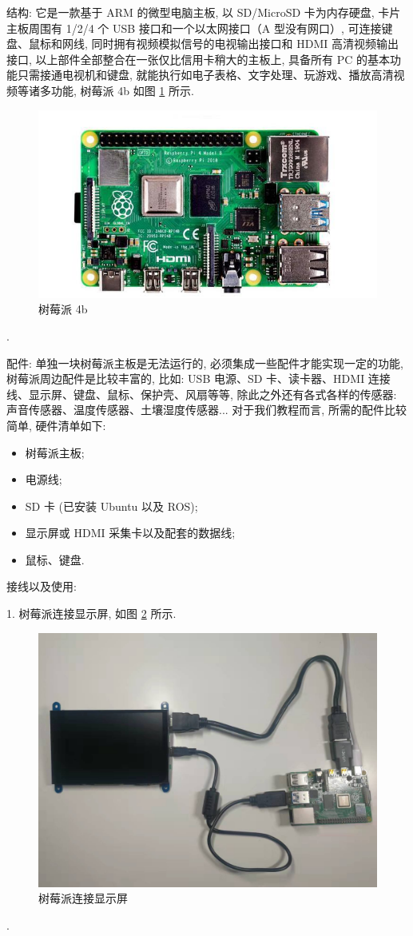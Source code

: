 \documentclass[openany, fontset=windowsold]{ctexbook}
\theoremstyle{kaiti}
\theoremstyle{normal}
\begin{document}
结构: 它是一款基于 ARM 的微型电脑主板, 以 SD/MicroSD 卡为内存硬盘, 卡片主板周围有 1/2/4 个 USB 接口和一个以太网接口（A 型没有网口）, 可连接键盘、鼠标和网线, 同时拥有视频模拟信号的电视输出接口和 HDMI 高清视频输出接口, 以上部件全部整合在一张仅比信用卡稍大的主板上, 具备所有 PC 的基本功能只需接通电视机和键盘, 就能执行如电子表格、文字处理、玩游戏、播放高清视频等诸多功能, 树莓派 4b 如图 \ref{fig:Raspberry_Pi} 所示.

\begin{figure}[!ht]
  \centering
  \includegraphics[width=.7\textwidth]{Raspberry_Pi.jpg}
  \caption{树莓派 4b}
  \label{fig:Raspberry_Pi}
\end{figure}.

配件: 单独一块树莓派主板是无法运行的, 必须集成一些配件才能实现一定的功能, 树莓派周边配件是比较丰富的, 比如: USB 电源、SD 卡、读卡器、HDMI 连接线、显示屏、键盘、鼠标、保护壳、风扇等等, 除此之外还有各式各样的传感器: 声音传感器、温度传感器、土壤湿度传感器... 对于我们教程而言, 所需的配件比较简单, 硬件清单如下:

\begin{itemize}
  \item 树莓派主板;
  \item 电源线;
  \item SD 卡 (已安装 Ubuntu 以及 ROS);
  \item 显示屏或 HDMI 采集卡以及配套的数据线;
  \item 鼠标、键盘.
\end{itemize}

接线以及使用:

1. 树莓派连接显示屏, 如图 \ref{fig:Raspberry_Pi_show} 所示.

\begin{figure}[!ht]
  \centering
  \includegraphics[width=.5\textwidth]{Raspberry_Pi_show.jpg}
  \caption{树莓派连接显示屏}
  \label{fig:Raspberry_Pi_show}
\end{figure}.
\end{document}
